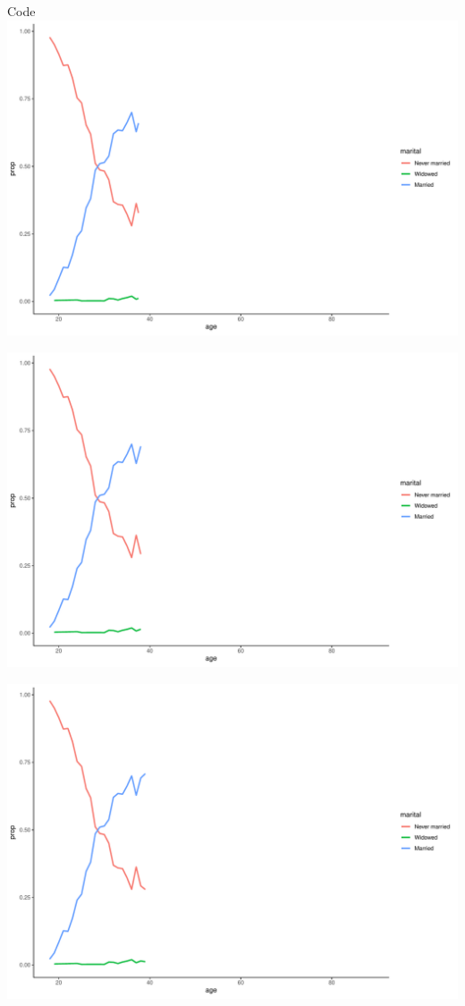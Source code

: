 \documentclass[
  ignorenonframetext,
]{beamer}
\begin{document}
\begin{frame}[fragile]{Code}
\includegraphics{gss_cat_files/figure-beamer/unnamed-chunk-1-32.pdf}

\includegraphics{gss_cat_files/figure-beamer/unnamed-chunk-1-33.pdf}

\includegraphics{gss_cat_files/figure-beamer/unnamed-chunk-1-34.pdf}


\end{frame}
\end{document}
